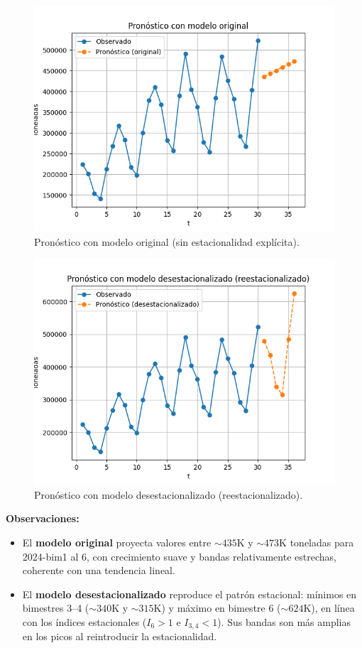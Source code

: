 \documentclass[10pt]{article}
\begin{document}
\begin{enumerate}
{\begin{figure}[H]
          \centering
          \includegraphics[width=0.7\linewidth]{../plots/python/avocado_exports_original_forecast.png}
          \caption{Pronóstico con modelo original (sin estacionalidad explícita).}
          \label{fig:forecast_original}
        \end{figure}
        \begin{figure}[H]
          \centering
          \includegraphics[width=0.7\linewidth]{../plots/python/avocado_exports_deseasonalized_forecast.png}
          \caption{Pronóstico con modelo desestacionalizado (reestacionalizado).}
          \label{fig:forecast_deseason}
        \end{figure}
        \noindent\textbf{Observaciones:}
        \begin{itemize}
          \item El \textbf{modelo original} proyecta valores entre \(\sim\!435\text{K}\) y \(\sim\!473\text{K}\) toneladas para 2024-bim1 al 6, con crecimiento suave y bandas relativamente estrechas, coherente con una tendencia lineal.
          \item El \textbf{modelo desestacionalizado} reproduce el patrón estacional: mínimos en bimestres 3--4 (\(\sim\!340\)K y \(\sim\!315\)K) y máximo en bimestre 6 (\(\sim\!624\)K), en línea con los índices estacionales ($I_6>1$ e $I_{3,4}<1$). Sus bandas son más amplias en los picos al reintroducir la estacionalidad.
        \end{itemize}
      }
    \end{enumerate}
\end{document}
